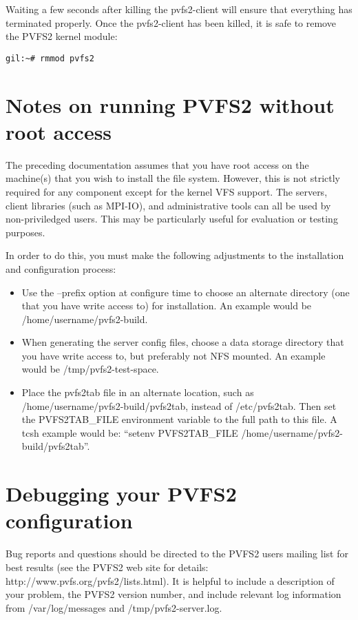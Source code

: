 \documentclass[11pt, letterpaper]{article}
\begin{document}
Waiting a few seconds after killing the pvfs2-client will ensure that
everything has terminated properly.  Once the pvfs2-client has been
killed, it is safe to remove the PVFS2 kernel module:
\begin{verbatim}
gil:~# rmmod pvfs2
\end{verbatim}

\appendix

\section{Notes on running PVFS2 without root access}

The preceding documentation assumes that you have root access on the
machine(s) that you wish to install the file system.  However, this is
not strictly required for any component except for the kernel VFS
support.  The servers, client libraries (such as MPI-IO), and
administrative tools can all be used by non-priviledged users.  This
may be particularly useful for evaluation or testing purposes.

In order to do this, you must make the following adjustments to the
installation and configuration process:
\begin{itemize}
\item Use the --prefix option at configure time to choose an alternate
directory (one that you have write access to) for installation.  An example
would be /home/username/pvfs2-build.
\item When generating the server config files, choose a data storage
directory that you have write access to, but preferably not NFS mounted.  An
example would be /tmp/pvfs2-test-space.
\item Place the pvfs2tab file in an alternate location, such as
/home/username/pvfs2-build/pvfs2tab, instead of /etc/pvfs2tab.
Then set the PVFS2TAB\_FILE environment variable to the full path
to this file.  A tcsh example would be: ``setenv PVFS2TAB\_FILE
/home/username/pvfs2-build/pvfs2tab''.
\end{itemize}


\section{Debugging your PVFS2 configuration}

Bug reports and questions should be directed to the PVFS2 users
mailing list for best results (see the PVFS2 web site for details:
http://www.pvfs.org/pvfs2/lists.html).  It is helpful to include a
description of your problem, the PVFS2 version number, and include
relevant log information from /var/log/messages and
/tmp/pvfs2-server.log.
\end{document}
